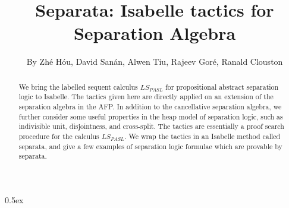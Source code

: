 \documentclass[11pt,a4paper]{article}
\begin{document}
\title{Separata: Isabelle tactics for Separation Algebra}
\author{By Zh\'e H\'ou, David San\'an, Alwen Tiu, Rajeev Gor\'e, Ranald Clouston}
\maketitle

\begin{abstract}
We bring the labelled sequent calculus $LS_{PASL}$ for propositional
abstract separation logic to Isabelle. The tactics given here are
directly applied on an extension of the separation algebra in the
AFP. In addition to the cancellative separation algebra, we further
consider some useful properties in the heap model of separation logic,
such as indivisible unit, disjointness, and cross-split. The tactics
are essentially a proof search procedure for the calculus
$LS_{PASL}$. We wrap the tactics in an Isabelle method called
separata, and give a few examples of separation logic formulae which
are provable by separata.
\end{abstract}

\tableofcontents

\parindent 0pt\parskip 0.5ex



%
%
\end{document}
